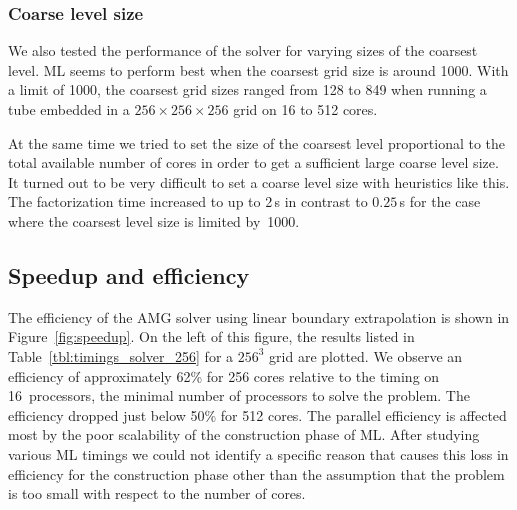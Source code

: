 \subsubsection*{Coarse level size}

We also tested the performance of the solver for varying sizes of the
coarsest level.  ML seems to perform best when the coarsest grid size is
around 1000.  With a limit of 1000, the coarsest grid sizes ranged from
128 to 849 when running a tube embedded in a $256 \times 256 \times 256$
grid on 16 to 512 cores.

At the same time we tried to set the size of the coarsest level
proportional to the total available number of cores in order to get a
sufficient large coarse level size.  It turned out to be very difficult
to set a coarse level size with heuristics like this.  The factorization
time increased to up to 2\,s in contrast to $0.25$\,s for the case where
the coarsest level size is limited by~1000.


\subsection{Speedup and efficiency}

The efficiency of the AMG solver using linear boundary extrapolation is
shown in Figure~\ref{fig:speedup}.  On the left of this figure, the
results listed in Table~\ref{tbl:timings_solver_256} for a $256^3$ grid are
plotted.  We observe an efficiency of approximately 62\% for 256 cores
relative to the timing on 16~processors, the minimal number of
processors to solve the problem.  The efficiency dropped just below 50\%
for 512 cores.  The parallel efficiency is affected most by the poor
scalability of the construction phase of ML.  After studying various ML
timings we could not identify a specific reason that causes this loss in
efficiency for the construction phase other than the assumption that the
problem is too small with respect to the number of cores.

